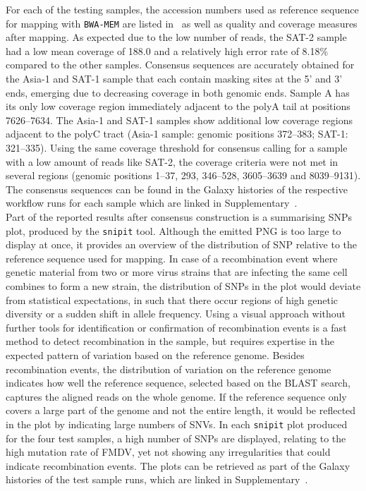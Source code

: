 For each of the testing samples, the accession numbers used as reference sequence for mapping with \texttt{BWA-MEM} are listed in~ as well as quality and coverage measures after mapping. As expected due to the low number of reads, the SAT-2 sample had a low mean coverage of {188.0\texttimes } and a relatively high error rate of 8.18\% compared to the other samples. Consensus sequences are accurately obtained for the Asia-1 and SAT-1 sample that each contain masking sites at the 5' and 3' ends, emerging due to decreasing coverage in both genomic ends. Sample A has its only low coverage region immediately adjacent to the polyA tail at positions 7626--7634. The Asia-1 and SAT-1 samples show additional low coverage regions adjacent to the polyC tract (Asia-1 sample: genomic positions 372--383; SAT-1: 321--335). Using the same coverage threshold for consensus calling for a sample with a low amount of reads like SAT-2, the coverage criteria were not met in several regions (genomic positions 1--37, 293, 346--528, 3605--3639 and 8039--9131). The consensus sequences can be found in the Galaxy histories of the respective workflow runs for each sample which are linked in Supplementary~. \\
Part of the reported results after consensus construction is a summarising \acp{SNP} plot, produced by the \texttt{snipit} tool. Although the emitted PNG is too large to display at once, it provides an overview of the distribution of \acs{SNP} relative to the reference sequence used for mapping. In case of a recombination event where genetic material from two or more virus strains that are infecting the same cell combines to form a new strain, the distribution of \acp{SNP} in the plot would deviate from statistical expectations, in such that there occur regions of high genetic diversity or a sudden shift in allele frequency. Using a visual approach without further tools for identification or confirmation of recombination events is a fast method to detect recombination in the sample, but requires expertise in the expected pattern of variation based on the reference genome. Besides recombination events, the distribution of variation on the reference genome indicates how well the reference sequence, selected based on the \ac{BLAST} search, captures the aligned reads on the whole genome. If the reference sequence only covers a large part of the genome and not the entire length, it would be reflected in the plot by indicating large numbers of \acp{SNV}. In each \texttt{snipit} plot produced for the four test samples, a high number of \acp{SNP} are displayed, relating to the high mutation rate of \ac{FMDV}, yet not showing any irregularities that could indicate recombination events. The plots can be retrieved as part of the Galaxy histories of the test sample runs, which are linked in Supplementary~.

